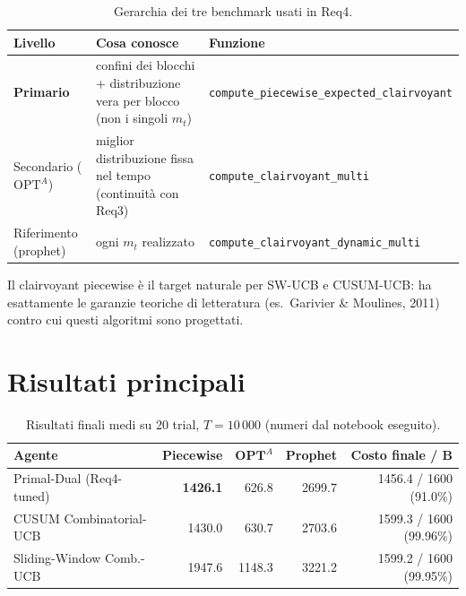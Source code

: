 \documentclass[11pt]{article}
\begin{document}
\begin{table}[h]
\centering
\small
\begin{tabularx}{\textwidth}{@{}l X l@{}}
\toprule
\textbf{Livello} & \textbf{Cosa conosce} & \textbf{Funzione} \\
\midrule
\textbf{Primario} & confini dei blocchi + distribuzione vera per blocco (non i singoli $m_t$) & \small\texttt{compute\_piecewise\_}\newline\small\texttt{expected\_clairvoyant} \\
Secondario ($\text{OPT}^A$) & miglior distribuzione fissa nel tempo (continuità con Req3) & \small\texttt{compute\_clairvoyant\_}\newline\small\texttt{multi} \\
Riferimento (prophet) & ogni $m_t$ realizzato & \small\texttt{compute\_clairvoyant\_}\newline\small\texttt{dynamic\_multi} \\
\bottomrule
\end{tabularx}
\caption{Gerarchia dei tre benchmark usati in Req4.}
\end{table}

Il clairvoyant piecewise è il target naturale per SW-UCB e CUSUM-UCB: ha esattamente le garanzie teoriche di letteratura (es.\ Garivier \& Moulines, 2011) contro cui questi algoritmi sono progettati.

\section{Risultati principali}

\begin{table}[h]
\centering
\small
\begin{tabular}{@{}lrrrr@{}}
\toprule
\textbf{Agente} & \textbf{Piecewise} & $\textbf{OPT}^A$ & \textbf{Prophet} & \textbf{Costo finale / B} \\
\midrule
Primal-Dual (Req4-tuned) & \textbf{1426.1} & 626.8 & 2699.7 & 1456.4 / 1600 (91.0\%) \\
CUSUM Combinatorial-UCB & 1430.0 & 630.7 & 2703.6 & 1599.3 / 1600 (99.96\%) \\
Sliding-Window Comb.-UCB & 1947.6 & 1148.3 & 3221.2 & 1599.2 / 1600 (99.95\%) \\
\bottomrule
\end{tabular}
\caption{Risultati finali medi su 20 trial, $T=10\,000$ (numeri dal notebook eseguito).}
\end{table}
\end{document}
